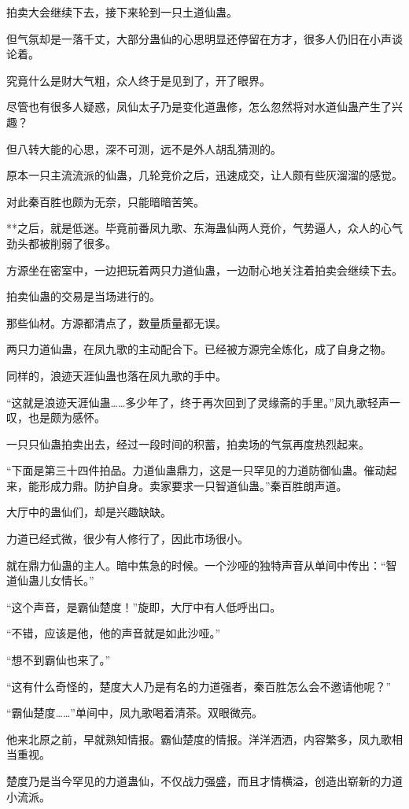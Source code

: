 \begin{this_body}
拍卖大会继续下去，接下来轮到一只土道仙蛊。

但气氛却是一落千丈，大部分蛊仙的心思明显还停留在方才，很多人仍旧在小声谈论着。

究竟什么是财大气粗，众人终于是见到了，开了眼界。

尽管也有很多人疑惑，凤仙太子乃是变化道蛊修，怎么忽然将对水道仙蛊产生了兴趣？

但八转大能的心思，深不可测，远不是外人胡乱猜测的。

原本一只主流流派的仙蛊，几轮竞价之后，迅速成交，让人颇有些灰溜溜的感觉。

对此秦百胜也颇为无奈，只能暗暗苦笑。

**之后，就是低迷。毕竟前番凤九歌、东海蛊仙两人竞价，气势逼人，众人的心气劲头都被削弱了很多。

方源坐在密室中，一边把玩着两只力道仙蛊，一边耐心地关注着拍卖会继续下去。

拍卖仙蛊的交易是当场进行的。

那些仙材。方源都清点了，数量质量都无误。

两只力道仙蛊，在凤九歌的主动配合下。已经被方源完全炼化，成了自身之物。

同样的，浪迹天涯仙蛊也落在凤九歌的手中。

“这就是浪迹天涯仙蛊……多少年了，终于再次回到了灵缘斋的手里。”凤九歌轻声一叹，也是颇为感怀。

一只只仙蛊拍卖出去，经过一段时间的积蓄，拍卖场的气氛再度热烈起来。

“下面是第三十四件拍品。力道仙蛊鼎力，这是一只罕见的力道防御仙蛊。催动起来，能形成力鼎。防护自身。卖家要求一只智道仙蛊。”秦百胜朗声道。

大厅中的蛊仙们，却是兴趣缺缺。

力道已经式微，很少有人修行了，因此市场很小。

就在鼎力仙蛊的主人。暗中焦急的时候。一个沙哑的独特声音从单间中传出：“智道仙蛊儿女情长。”

“这个声音，是霸仙楚度！”旋即，大厅中有人低呼出口。

“不错，应该是他，他的声音就是如此沙哑。”

“想不到霸仙也来了。”

“这有什么奇怪的，楚度大人乃是有名的力道强者，秦百胜怎么会不邀请他呢？”

“霸仙楚度……”单间中，凤九歌喝着清茶。双眼微亮。

他来北原之前，早就熟知情报。霸仙楚度的情报。洋洋洒洒，内容繁多，凤九歌相当重视。

楚度乃是当今罕见的力道蛊仙，不仅战力强盛，而且才情横溢，创造出崭新的力道小流派。


\end{this_body}
